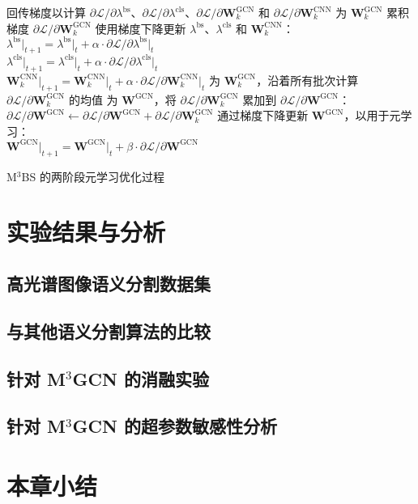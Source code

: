 \begin{algorithm}
\begin{algorithmic}
            \State 回传梯度以计算 $\partial{\mathcal{L}}/\partial\lambda^\text{bs}$、$\partial{\mathcal{L}}/\partial\lambda^\text{cls}$、$\partial{\mathcal{L}}/\partial{\mathbf{W}^\text{GCN}_k}$ 和 $\partial{\mathcal{L}}/\partial{\mathbf{W}^\text{CNN}_k}$
            \State 为 $\mathbf{W}_k^\text{GCN}$ 累积梯度 $\partial{\mathcal{L}}/\partial{\mathbf{W}^\text{GCN}_k}$
            \State 使用梯度下降更新 $\lambda^\text{bs}$、$\lambda^\text{cls}$ 和 $\mathbf{W}_k^\text{CNN}$：\\
            $\lambda^\text{bs}\vert_{t+1} = \lambda^\text{bs}\vert_t + \alpha \cdot \partial{\mathcal{L}}/\partial{\lambda^\text{bs}\vert_t}$\\
            $\lambda^\text{cls}\vert_{t+1} = \lambda^\text{cls}\vert_t + \alpha \cdot \partial{\mathcal{L}}/\partial{\lambda^\text{cls}\vert_t}$\\
            $\mathbf{W}^\text{CNN}_k\vert_{t+1} = \mathbf{W}^\text{CNN}_k\vert_t + \alpha \cdot \partial{\mathcal{L}}/\partial{\mathbf{W}^\text{CNN}_k\vert_t}$
        \EndFor
        \State 为 $\mathbf{W}_k^\text{GCN}$，沿着所有批次计算 $\partial{\mathcal{L}}/\partial{\mathbf{W}^\text{GCN}_k}$ 的均值
        \State 为 $\mathbf{W}^\text{GCN}$，将 $\partial{\mathcal{L}}/\partial{\mathbf{W}^\text{GCN}_k}$ 累加到 $\partial{\mathcal{L}}/\partial{\mathbf{W}^\text{GCN}}$：\\
        $\partial{\mathcal{L}}/\partial{\mathbf{W}^\text{GCN}} \leftarrow \partial{\mathcal{L}}/\partial{\mathbf{W}^\text{GCN}} + \partial{\mathcal{L}}/\partial{\mathbf{W}^\text{GCN}_k}$
    \EndFor
    \State 通过梯度下降更新 $\mathbf{W}^\text{GCN}$，以用于元学习：\\
    $\mathbf{W}^\text{GCN}\vert_{t+1} = \mathbf{W}^\text{GCN}\vert_t + \beta \cdot \partial{\mathcal{L}}/\partial{\mathbf{W}^\text{GCN}}$
\EndFor
\end{algorithmic}
\caption{M$^3$BS 的两阶段元学习优化过程}
\label{alg3}
\end{algorithm}

\section{实验结果与分析}
\subsection{高光谱图像语义分割数据集}
\subsection{与其他语义分割算法的比较}
\subsection{针对 M$^3$GCN 的消融实验}
\subsection{针对 M$^3$GCN 的超参数敏感性分析}
\section{本章小结}
